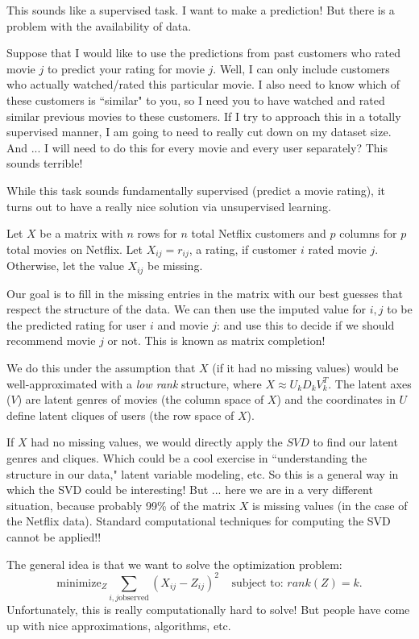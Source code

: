 This sounds like a supervised task. I want to make a prediction! But there is a problem with the availability of data.

Suppose that I would like to use the predictions from past customers who rated movie $j$ to predict your rating for movie $j$. Well, I can only include customers who actually watched/rated this particular movie. I also need to know which of these customers is ``similar" to you, so I need you to have watched and rated similar previous movies to these customers. If I try to approach this in a totally supervised manner, I am going to need to really cut down on my dataset size. And ... I will need to do this for every movie and every user separately? This sounds terrible!

While this task sounds fundamentally supervised (predict a movie rating), it turns out to have a really nice solution via unsupervised learning. 

Let $X$ be a matrix with $n$ rows for $n$ total Netflix customers and $p$ columns for $p$ total movies on Netflix. Let $X_{ij} = r_{ij}$, a rating, if customer $i$ rated movie $j$. Otherwise, let the value $X_{ij}$ be missing.

Our goal is to fill in the missing entries in the matrix with our best guesses that respect the structure of the data. We can then use the imputed value for $i,j$ to be the predicted rating for user $i$ and movie $j$: and use this to decide if we should recommend movie $j$ or not. This is known as matrix completion! 

We do this under the assumption that $X$ (if it had no missing values) would be well-approximated with a \emph{low rank} structure, where $X \approx U_kD_k V_k^T$. The latent axes ($V$) are latent genres of movies (the column space of $X$) and the coordinates in $U$ define latent cliques of users (the row space of $X$). 

If $X$ had no missing values, we would directly apply the $SVD$ to find our latent genres and cliques. Which could be a cool exercise in ``understanding the structure in our data," latent variable modeling, etc. So this is a general way in which the SVD could be interesting! But ... here we are in a very different situation, because probably 99\% of the matrix $X$ is missing values (in the case of the Netflix data). Standard computational techniques for computing the SVD cannot be applied!!

The general idea is that we want to solve the optimization problem:
$$
\mathrm{minimize}_Z \sum_{i,j \mathrm{observed}} (X_{ij} - Z_{ij})^2 \ \ \ \ \ \text{subject to: } rank(Z)=k. 
$$
Unfortunately, this is really computationally hard to solve! But people have come up with nice approximations, algorithms, etc. 

